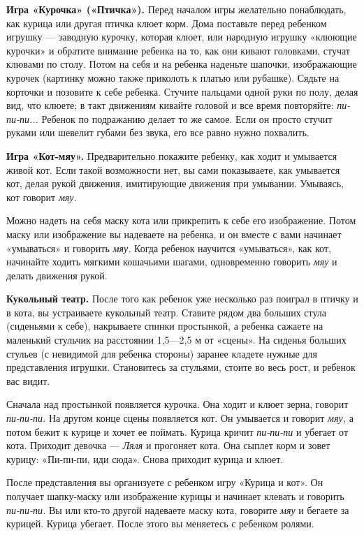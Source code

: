 \documentclass[a5paper]{book}
\renewcommand{\emph}[1]{\textit{#1}}
\begin{document}
\textbf{Игра «Курочка» («Птичка»).} Перед началом игры желательно
понаблюдать, как курица или другая птичка клюет корм. Дома поставьте
перед ребенком игрушку --- заводную курочку, которая клюет, или народную
игрушку «клюющие курочки» и обратите внимание ребенка на то, как они
кивают головками, стучат клювами по столу. Потом на себя и на ребенка
наденьте шапочки, изображающие курочек (картинку можно также приколоть к
платью или рубашке). Сядьте на корточки и позовите к себе ребенка.
Стучите пальцами одной руки по полу, делая вид, что клюете; в такт
движениям кивайте головой и все время повторяйте: \emph{пи-пи-пи...}
Ребенок по подражанию делает то же самое. Если он просто стучит руками
или шевелит губами без звука, его все равно нужно похвалить.

\textbf{Игра «Кот-мяу».} Предварительно покажите ребенку, как ходит и
умывается живой кот. Если такой возможности нет, вы сами показываете,
как умывается кот, делая рукой движения, имитирующие движения при
умывании. Умываясь, кот говорит \emph{мяу.}

Можно надеть на себя маску кота или прикрепить к себе его изображение.
Потом маску или изображение вы надеваете на ребенка, и он вместе с вами
начинает «умываться» и говорить \emph{мяу.} Когда ребенок научится
«умываться», как кот, начинайте ходить мягкими кошачьими шагами,
одновременно говорить \emph{мяу} и делать движения рукой.

\textbf{Кукольный театр.} После того как ребенок уже несколько раз
поиграл в птичку и в кота, вы устраиваете кукольный театр. Ставите рядом
два больших стула (сиденьями к себе), накрываете спинки простынкой, а
ребенка сажаете на маленький стульчик на расстоянии 1,5---2,5 м от
«сцены». На сиденья больших стульев (с невидимой для ребенка стороны)
заранее кладете нужные для представления игрушки. Становитесь за
стульями, стоите во весь рост, и ребенок вас видит.

Сначала над простынкой появляется курочка. Она ходит и клюет зерна,
говорит \emph{пи-пи-пи.} На другом конце сцены появляется кот. Он
умывается и говорит \emph{мяу,} а потом бежит к курице и хочет ее
поймать. Курица кричит \emph{пи-пи-пи} и убегает от кота. Приходит
девочка --- \emph{Ляля} и прогоняет кота. Она сыплет корм и зовет
курицу: «Пи-пи-пи, иди сюда». Снова приходит курица и клюет.

После представления вы организуете с ребенком игру «Курица и кот». Он
получает шапку-маску или изображение курицы и начинает клевать и
говорить \emph{пи-пи-пи.} Вы или кто-то другой надеваете маску кота,
говорите \emph{мяу} и бегаете за курицей. Курица убегает. После этого вы
меняетесь с ребенком ролями.
\end{document}
